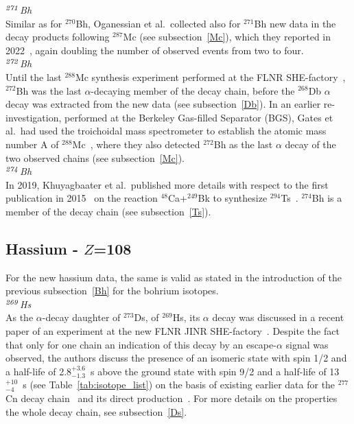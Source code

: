 {\it $^{\it271}$Bh}\\
Similar as for $^{270}$Bh, Oganessian et al.~collected also for $^{271}$Bh new data in the decay products following $^{287}$Mc (see subsection~\ref{Mc}), which they reported in 2022~\cite{Oganessian2022d}, again doubling the number of observed events from two to four.\\

{\it $^{\it272}$Bh}\\
Until the last $^{288}$Mc synthesis experiment performed at the FLNR SHE-factory~\cite{Oganessian2022d}, $^{272}$Bh was the last $\alpha$-decaying member of the decay chain, before the $^{268}$Db $\alpha$ decay was extracted from the new data (see subsection~\ref{Db}). In an earlier re-investigation, performed at the Berkeley Gas-filled Separator (BGS), Gates et al.~had used the troichoidal mass spectrometer to establish the atomic mass number A of $^{288}$Mc~\cite{Gates2018}, where they also detected $^{272}$Bh as the last $\alpha$ decay of the two observed chains (see subsection~\ref{Mc}).\\

{\it $^{\it274}$Bh}\\
In 2019, Khuyagbaater et al.~published more details with respect to the first publication in 2015~\cite{Khuyagbaatar2015} on the reaction $^{48}$Ca+$^{249}$Bk to synthesize $^{294}$Ts~\cite{Khuyagbaatar2019}. 
$^{274}$Bh is a member of the decay chain (see subsection~\ref{Ts}).

\subsection{Hassium - $Z$=108}\label{Hs}

For the new hassium data, the same is valid as stated in the introduction of the previous subsection~\ref{Bh} for the bohrium isotopes.\\

{\it $^{\it269}$Hs}\\
As the $\alpha$-decay daughter of $^{273}$Ds, of $^{269}$Hs, its $\alpha$ decay was discussed in a recent paper of an experiment at the new FLNR JINR SHE-factory~\cite{Oganessian2024}. 
Despite the fact that only for one chain an indication of this decay by an escape-$\alpha$ signal was observed, the authors discuss the presence of an isomeric state with spin 1/2 and a half-life of 2.8$^{+3.6}_{-1.3}$~s above the ground state with spin 9/2 and a half-life of 13$^{+10}_{-4}$~s (see Table~\ref{tab:isotope_list}) on the basis of existing earlier data for the $^{277}$Cn decay chain~\cite{Hofmann2002,Sumita2013} and its direct production~\cite{Dvorak2006,Dvorak2008}. For more details on the properties the whole decay chain, see subsection~\ref{Ds}.\\

